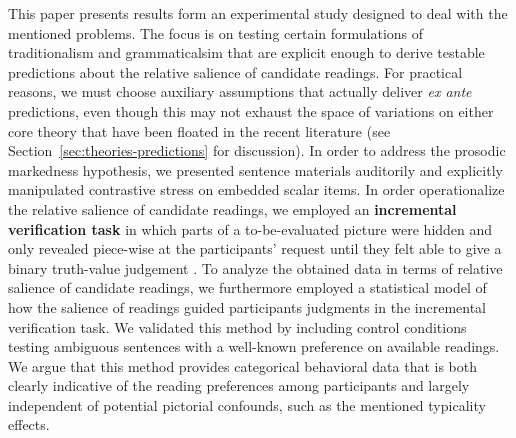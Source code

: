 \documentclass[fleqn,reqno,10pt]{article}
\renewcommand{\mymark}[1]{\textbf{#1}}
\begin{document}
This paper presents results form an experimental study designed to
deal with the mentioned problems. The focus is on testing certain
formulations of traditionalism and grammaticalsim that are explicit
enough to derive testable predictions about the relative salience of
candidate readings. For practical reasons, we must choose auxiliary
assumptions that actually deliver \emph{ex ante} predictions, even
though this may not exhaust the space of variations on either core
theory that have been floated in the recent literature (see
Section~\ref{sec:theories-predictions} for discussion). In order to
address the prosodic markedness hypothesis, we presented sentence
materials auditorily and explicitly manipulated contrastive stress on
embedded scalar items. In order operationalize the relative salience
of candidate readings, we employed an \mymark{incremental verification
  task} in which parts of a to-be-evaluated picture were hidden and
only revealed piece-wise at the participants’ request until they felt
able to give a binary truth-value judgement
\citep[see][]{Conroy2008}. To analyze the obtained data in terms of
relative salience of candidate readings, we furthermore employed a
statistical model of how the salience of readings guided participants
judgments in the incremental verification task. We validated this
method by including control conditions testing ambiguous sentences
with a well-known preference on available readings. We argue that this
method provides categorical behavioral data that is both clearly
indicative of the reading preferences among participants and largely
independent of potential pictorial confounds, such as the mentioned
typicality effects.
\end{document}
